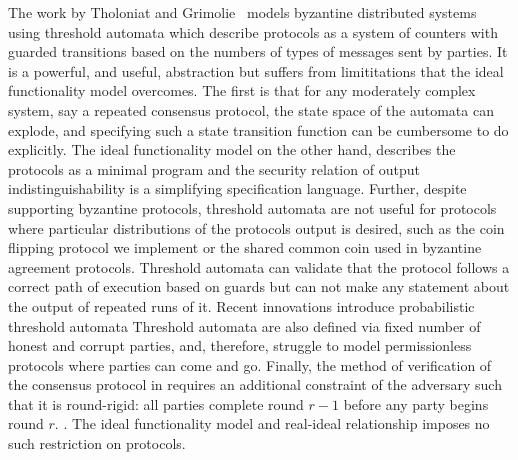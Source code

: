 The work by Tholoniat and Grimolie~\cite{tholoniat2022formal} models byzantine
distributed systems using threshold automata which describe protocols as a
system of counters with guarded transitions based on the numbers of types of
messages sent by parties.  It is a powerful, and useful, abstraction but
suffers from limititations that the ideal functionality model overcomes.  The
first is that for any moderately complex system, say a repeated consensus
protocol, the state space of the automata can explode, and specifying such a
state transition function can be cumbersome to do explicitly.  The ideal
functionality model on the other hand, describes the protocols as a minimal
program and the security relation of output indistinguishability is a
simplifying specification language.  Further, despite supporting byzantine
protocols, threshold automata are not useful for protocols where particular
distributions of the protocols output is desired, such as the coin flipping
protocol we implement or the shared common coin used in byzantine agreement
protocols.  Threshold automata can validate that the protocol follows a correct
path of execution based on guards but can not make any statement about the
output of repeated runs of it.  Recent innovations introduce probabilistic
threshold automata Threshold automata are also defined via fixed number of
honest and corrupt parties, and, therefore, struggle to model permissionless
protocols where parties can come and go.  Finally, the method of verification
of the consensus protocol in \cite{tholoniate2022formal} requires an additional
constraint of the adversary such that it is round-rigid: all parties complete
round $r-1$ before any party begins round $r$. .  The ideal
functionality model and real-ideal relationship imposes no such restriction on
protocols.



